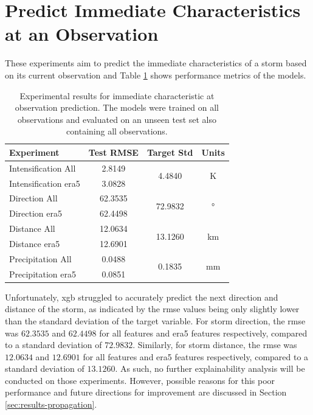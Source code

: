 \clearpage
\section{Predict Immediate Characteristics at an Observation}

These experiments aim to predict the immediate characteristics of a storm based on its current observation and Table \ref{tab:obs_experiment_results} shows performance metrics of the models. 

\begin{table}[h!]
\centering
\caption{Experimental results for immediate characteristic at observation prediction. The models were trained on all observations and evaluated on an unseen test set also containing all observations.}
\label{tab:obs_experiment_results}
\begin{tabular}{lccc}
\hline
\textbf{Experiment} & \textbf{Test RMSE} & \textbf{Target Std} & \textbf{Units} \\
\hline
Intensification All & 2.8149  & \multirow{2}{*}{4.4840}  & \multirow{2}{*}{\unit{\kelvin}} \\
Intensification \acrshort{era5} & 3.0828  & &  \\ \hline
Direction All & 62.3535 & \multirow{2}{*}{72.9832} & \multirow{2}{*}{\unit{\degree}} \\
Direction \acrshort{era5} & 62.4498 & & \\ \hline
Distance All & 12.0634 & \multirow{2}{*}{13.1260} & \multirow{2}{*}{\unit{\km}} \\
Distance \acrshort{era5} & 12.6901 & & \\ \hline
Precipitation All & 0.0488  & \multirow{2}{*}{0.1835}  & \multirow{2}{*}{\unit{\milli\meter}} \\
Precipitation \acrshort{era5} & 0.0851  & & \\
\hline
\end{tabular}
\end{table}

Unfortunately, \acrshort{xgb} struggled to accurately predict the next direction and distance of the storm, as indicated by the \acrshort{rmse} values being only slightly lower than the standard deviation of the target variable. For storm direction, the \acrshort{rmse} was $62.3535$ and $62.4498$ for all features and \acrshort{era5} features respectively, compared to a standard deviation of $72.9832$. Similarly, for storm distance, the \acrshort{rmse} was $12.0634$ and $12.6901$ for all features and \acrshort{era5} features respectively, compared to a standard deviation of $13.1260$. As such, no further explainability analysis will be conducted on those experiments. However, possible reasons for this poor performance and future directions for improvement are discussed in Section \ref{sec:results-propagation}.

